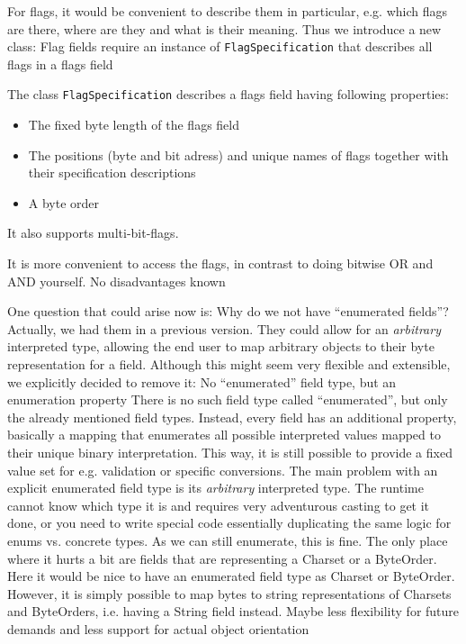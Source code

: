 For flags, it would be convenient to describe them in particular, e.g. which flags are there, where are they and what is their meaning. Thus we introduce a new class:
{%
Flag fields require an instance of \texttt{FlagSpecification} that describes all flags in a flags field
}
{%
The class \texttt{FlagSpecification} describes a flags field having following properties:
\begin{itemize}
\item The fixed byte length of the flags field
\item The positions (byte and bit adress) and unique names of flags together with their specification descriptions 
\item A byte order
\end{itemize}

It also supports multi-bit-flags.
}
{%
It is more convenient to access the flags, in contrast to doing bitwise OR and AND yourself.
}
{%
No disadvantages known
}

One question that could arise now is: Why do we not have ``enumerated fields''? Actually, we had them in a previous version. They could allow for an \emph{arbitrary} interpreted type, allowing the end user to map arbitrary objects to their byte representation for a field. Although this might seem very flexible and extensible, we explicitly decided to remove it:
{%
No ``enumerated'' field type, but an enumeration property
}
{%
There is no such field type called ``enumerated'', but only the already mentioned field types. Instead, every field has an additional property, basically a mapping that enumerates all possible interpreted values mapped to their unique binary interpretation. This way, it is still possible to provide a fixed value set for e.g. validation or specific conversions.
}
{%
The main problem with an explicit enumerated field type is its \emph{arbitrary} interpreted type. The runtime cannot know which type it is and requires very adventurous casting to get it done, or you need to write special code essentially duplicating the same logic for enums vs. concrete types. As we can still enumerate, this is fine. The only place where it hurts a bit are fields that are representing a Charset or a ByteOrder. Here it would be nice to have an enumerated field type as Charset or ByteOrder. However, it is simply possible to map bytes to string representations of Charsets and ByteOrders, i.e. having a String field instead.
}
{%
Maybe less flexibility for future demands and less support for actual object orientation
}

